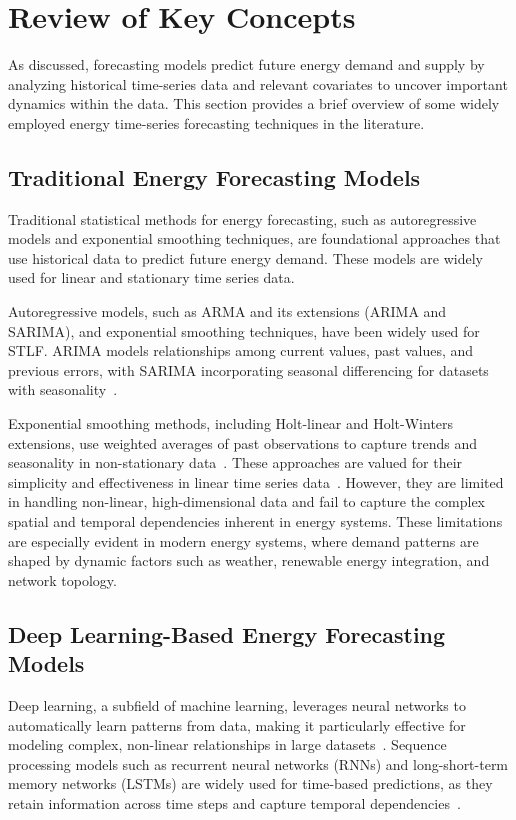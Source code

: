 \documentclass[sigconf,nonacm]{acmart}
\begin{document}
\section{Review of Key Concepts}
\label{sec:review}
As discussed, forecasting models predict future energy demand and supply by analyzing historical time-series data and relevant covariates to uncover important dynamics within the data. This section provides a brief overview of some widely employed energy time-series forecasting techniques in the literature.

\subsection{Traditional Energy Forecasting Models}

Traditional statistical methods for energy forecasting, such as autoregressive models and exponential smoothing techniques, are foundational approaches that use historical data to predict future energy demand. These models are widely used for linear and stationary time series data.

Autoregressive models, such as ARMA and its extensions (ARIMA and SARIMA), and exponential smoothing techniques, have been widely used for STLF. ARIMA models relationships among current values, past values, and previous errors, with SARIMA incorporating seasonal differencing for datasets with seasonality~\cite{Dannecker2015,Makridakis1997}. 
\par Exponential smoothing methods, including Holt-linear and Holt-Winters extensions, use weighted averages of past observations to capture trends and seasonality in non-stationary data~\cite{Lima2019}. These approaches are valued for their simplicity and effectiveness in linear time series data~\cite{Chodakowska2021,Lima2019,Deb2017}. However, they are limited in handling non-linear, high-dimensional data and fail to capture the complex spatial and temporal dependencies inherent in energy systems. These limitations are especially evident in modern energy systems, where demand patterns are shaped by dynamic factors such as weather, renewable energy integration, and network topology.

\subsection{Deep Learning-Based Energy Forecasting Models}

Deep learning, a subfield of machine learning, leverages neural networks to automatically learn patterns from data, making it particularly effective for modeling complex, non-linear relationships in large datasets~\cite{Berriel2017}. Sequence processing models such as recurrent neural networks (RNNs) and long-short-term memory networks (LSTMs) are widely used for time-based predictions, as they retain information across time steps and capture temporal dependencies~\cite{Werbos1990,Williams1989}.
\end{document}
